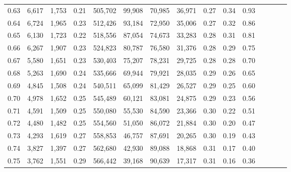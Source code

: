 \begin{tabular}{rrrcrrrrrrrrrrr}
0.63 &   6,617 &  1,753 &                                       0.21 &  505,702 &   99,908 &   70,985 &   36,971 &  0.27 &  0.34 &                         0.93 \\
0.64 &   6,724 &  1,965 &                                       0.23 &  512,426 &   93,184 &   72,950 &   35,006 &  0.27 &  0.32 &                         0.86 \\
0.65 &   6,130 &  1,723 &                                       0.22 &  518,556 &   87,054 &   74,673 &   33,283 &  0.28 &  0.31 &                         0.81 \\
0.66 &   6,267 &  1,907 &                                       0.23 &  524,823 &   80,787 &   76,580 &   31,376 &  0.28 &  0.29 &                         0.75 \\
0.67 &   5,580 &  1,651 &                                       0.23 &  530,403 &   75,207 &   78,231 &   29,725 &  0.28 &  0.28 &                         0.70 \\
0.68 &   5,263 &  1,690 &                                       0.24 &  535,666 &   69,944 &   79,921 &   28,035 &  0.29 &  0.26 &                         0.65 \\
0.69 &   4,845 &  1,508 &                                       0.24 &  540,511 &   65,099 &   81,429 &   26,527 &  0.29 &  0.25 &                         0.60 \\
0.70 &   4,978 &  1,652 &                                       0.25 &  545,489 &   60,121 &   83,081 &   24,875 &  0.29 &  0.23 &                         0.56 \\
0.71 &   4,591 &  1,509 &                                       0.25 &  550,080 &   55,530 &   84,590 &   23,366 &  0.30 &  0.22 &                         0.51 \\
0.72 &   4,480 &  1,482 &                                       0.25 &  554,560 &   51,050 &   86,072 &   21,884 &  0.30 &  0.20 &                         0.47 \\
0.73 &   4,293 &  1,619 &                                       0.27 &  558,853 &   46,757 &   87,691 &   20,265 &  0.30 &  0.19 &                         0.43 \\
0.74 &   3,827 &  1,397 &                                       0.27 &  562,680 &   42,930 &   89,088 &   18,868 &  0.31 &  0.17 &                         0.40 \\
0.75 &   3,762 &  1,551 &                                       0.29 &  566,442 &   39,168 &   90,639 &   17,317 &  0.31 &  0.16 &                         0.36 \\

\end{tabular}
